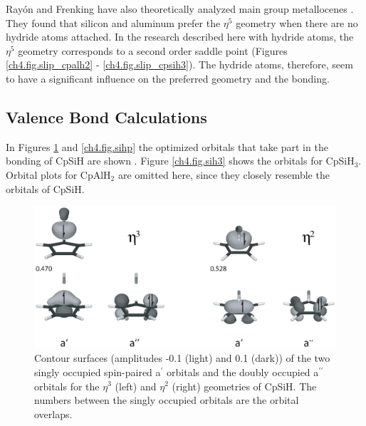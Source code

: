 Ray\'on and Frenking have also theoretically analyzed main group metallocenes \cite{rayon}. They found that silicon and aluminum prefer the $\eta^5$ geometry when there are no hydride atoms attached. In the research described here with hydride atoms, the $\eta^5$ geometry corresponds to a second order saddle point (Figures \ref{ch4.fig.slip_cpalh2} - \ref{ch4.fig.slip_cpsih3}). The hydride atoms, therefore, seem to have a significant influence on the preferred geometry and the bonding. 

\subsection{Valence Bond Calculations}

In Figures \ref{ch4.fig.sihs} and \ref{ch4.fig.sihp} the optimized orbitals that take part in the bonding of CpSiH are shown \cite{molden}. Figure \ref{ch4.fig.sih3} shows the orbitals for CpSiH$_3$. Orbital plots for CpAlH$_2$ are omitted here, since they closely resemble the orbitals of CpSiH. 

\begin{figure} [htbp]
\begin{center}
\includegraphics[scale=0.67]{cyclopentadienyl/figures/sih_sigma.eps}
\end{center}
\caption{Contour surfaces (amplitudes -0.1 (light) and 0.1 (dark)) of the two singly occupied spin-paired a$^\prime$ orbitals and the doubly occupied a$^{\prime\prime}$ orbitals for the $\eta^{3}$ (left) and $\eta^{2}$ (right) geometries of CpSiH. The numbers between the singly occupied orbitals are the orbital overlaps.}
\label{ch4.fig.sihs}
\end{figure}


